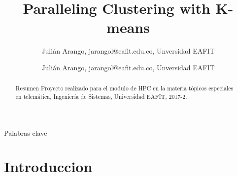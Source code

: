 \documentclass[journal]{IEEEtran}
\begin{document}
\title{Paralleling Clustering with K-means}
\author {Julián Arango, jarangol@eafit.edu.co, Unversidad EAFIT}
\author {Julián Arango, jarangol@eafit.edu.co, Unversidad EAFIT}
\maketitle

\begin{IEEEkeywords}
Palabras clave
\end{IEEEkeywords}

\begin{abstract}
Resumen
Proyecto realizado para el modulo de HPC en la materia tópicos especiales en
telemática, Ingeniería de Sistemas, Universidad EAFIT, 2017-2.
\end{abstract}

\section{Introduccion}


\end{document}
